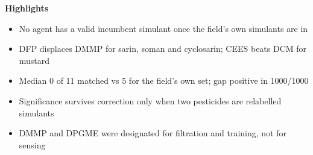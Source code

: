 \documentclass[11pt,a4paper]{article}
\begin{document}
\noindent\textbf{Highlights}\\[6pt]
\begin{itemize}\itemsep4pt
  \item No agent has a valid incumbent simulant once the field's own simulants are in
  \item DFP displaces DMMP for sarin, soman and cyclosarin; CEES beats DCM for mustard
  \item Median 0 of 11 matched vs 5 for the field's own set; gap positive in 1000/1000
  \item Significance survives correction only when two pesticides are relabelled simulants
  \item DMMP and DPGME were designated for filtration and training, not for sensing
\end{itemize}
\end{document}

